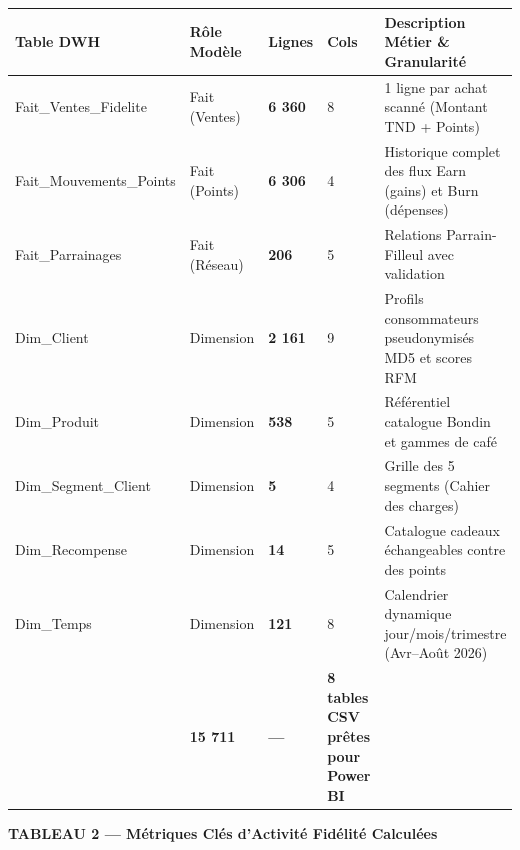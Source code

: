 \documentclass[11pt,a4paper]{article}
\begin{document}
\noindent
\renewcommand{\arraystretch}{0.98}
\begin{tabularx}{\textwidth}{>{\ttfamily\scriptsize}p{4.2cm} >{\scriptsize}p{2.1cm} >{\centering\scriptsize\bfseries}p{1.3cm} >{\centering\scriptsize}p{0.8cm} >{\scriptsize}X}
\toprule
\rowcolor{c1border}\color{white}\textbf{Table DWH} & \color{white}\textbf{Rôle Modèle} & \color{white}\textbf{Lignes} & \color{white}\textbf{Cols} & \color{white}\textbf{Description Métier \& Granularité} \\
\midrule
\rowcolor{c1bg!60} Fait\_Ventes\_Fidelite & Fait (Ventes) & 6 360 & 8 & 1 ligne par achat scanné (Montant TND + Points) \\
\rowcolor{white} Fait\_Mouvements\_Points & Fait (Points) & 6 306 & 4 & Historique complet des flux Earn (gains) et Burn (dépenses) \\
\rowcolor{c1bg!60} Fait\_Parrainages & Fait (Réseau) & 206 & 5 & Relations Parrain-Filleul avec validation \\
\rowcolor{white} Dim\_Client & Dimension & 2 161 & 9 & Profils consommateurs pseudonymisés MD5 et scores RFM \\
\rowcolor{c1bg!60} Dim\_Produit & Dimension & 538 & 5 & Référentiel catalogue Bondin et gammes de café \\
\rowcolor{white} Dim\_Segment\_Client & Dimension & 5 & 4 & Grille des 5 segments (Cahier des charges) \\
\rowcolor{c1bg!60} Dim\_Recompense & Dimension & 14 & 5 & Catalogue cadeaux échangeables contre des points \\
\rowcolor{white} Dim\_Temps & Dimension & 121 & 8 & Calendrier dynamique jour/mois/trimestre (Avr--Août 2026) \\
\midrule
\rowcolor{c3bg}\multicolumn{2}{l}{\textbf{TOTAL GENERAL DATA WAREHOUSE}} & \textbf{15 711} & --- & \textbf{8 tables CSV prêtes pour Power BI} \\
\bottomrule
\end{tabularx}

\vspace{0.2cm}

\noindent
{\small\bfseries\color{c4border} TABLEAU 2 --- Métriques Clés d'Activité Fidélité Calculées}
\vspace{0.08cm}
\end{document}
